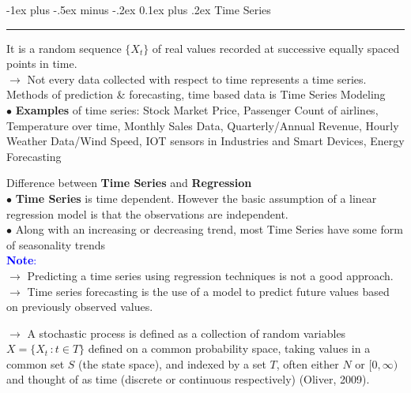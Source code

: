 \documentclass[letterpaper, 10.5pt,landscape]{article}
\makeatletter
\renewcommand{\section}{\@startsection{section}{1}{0mm}%
                                {-1ex plus -.5ex minus -.2ex}%
                                {0.1ex plus .2ex}%
                                {\normalfont\small}}
\makeatother
\begin{document}
\begin{multicols*}{3}









\section{Time Series} {\color{teal}\hrule height 1pt} \smallskip
It is a random sequence $\{X_{t} \}$ of real values recorded at successive equally spaced points in time. \\

$\rightarrow$ Not every data collected with respect to time represents a time series. \\
\hspace{5pt} Methods of prediction \& forecasting, time based data is Time Series Modeling \\

\vspace{2pt}
$\bullet$ \textbf{Examples} of time series: Stock Market Price, Passenger Count of airlines, Temperature over time, Monthly Sales Data, Quarterly/Annual Revenue, Hourly Weather Data/Wind Speed, IOT sensors in Industries and Smart Devices, Energy Forecasting

\vspace{3pt}
Difference between \textbf{Time Series} and \textbf{Regression} \\
$\bullet$ \textbf{Time Series} is time dependent. However the basic assumption of a linear regression model is that the observations are independent. \\
$\bullet$ Along with an increasing or decreasing trend, most Time Series have some form of seasonality trends\\

\vspace{3pt}
\textcolor{blue}{\textbf{Note}:}\\
$\rightarrow$ Predicting a time series using regression techniques is not a good approach. \\
$\rightarrow$ Time series forecasting is the use of a model to predict future values based on previously observed values.


\vspace{5pt}
$\rightarrow$ A stochastic process is defined as a collection of random variables $X=\{X_{t} \hspace{2pt}: t \in T\}$ defined on a common probability space, taking values in a common set $S$ (the state space), and indexed by a set $T$, often either $N$ or $[0, \infty)$ and thought of as time (discrete or continuous respectively) (Oliver, 2009).




\end{multicols*}
\end{document}
